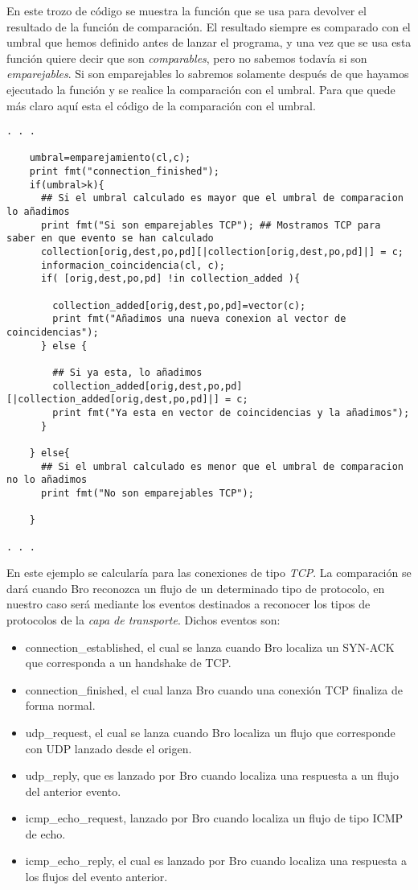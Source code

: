 \noindent En este trozo de código se muestra la función que se usa para devolver 
el resultado de la función de comparación. El resultado siempre es comparado 
con el umbral que hemos definido antes de lanzar el programa, y una vez que se 
usa esta función quiere decir que son \textit{comparables}, pero no sabemos todavía si son 
\textit{emparejables}. Si son emparejables lo sabremos solamente después de 
que hayamos ejecutado la función y se realice la comparación con el umbral. Para que 
quede más claro aquí esta el código de la comparación con el umbral.

\begin{lstlisting}[style=CodidoC]
. . .

	umbral=emparejamiento(cl,c);
    print fmt("connection_finished");
    if(umbral>k){
      ## Si el umbral calculado es mayor que el umbral de comparacion lo añadimos
      print fmt("Si son emparejables TCP"); ## Mostramos TCP para saber en que evento se han calculado
      collection[orig,dest,po,pd][|collection[orig,dest,po,pd]|] = c;
      informacion_coincidencia(cl, c);
      if( [orig,dest,po,pd] !in collection_added ){

        collection_added[orig,dest,po,pd]=vector(c);
        print fmt("Añadimos una nueva conexion al vector de coincidencias");
      } else {

        ## Si ya esta, lo añadimos
        collection_added[orig,dest,po,pd][|collection_added[orig,dest,po,pd]|] = c;
        print fmt("Ya esta en vector de coincidencias y la añadimos");
      }

    } else{
      ## Si el umbral calculado es menor que el umbral de comparacion no lo añadimos
      print fmt("No son emparejables TCP");

    }
    
. . .
\end{lstlisting}

\noindent En este ejemplo se calcularía para las conexiones de tipo \textit{TCP}.
\intro
La comparación se dará cuando Bro reconozca un flujo de un determinado tipo 
de protocolo, en nuestro caso será mediante los eventos destinados a 
reconocer los tipos de protocolos de la \textit{capa de transporte}.
Dichos eventos son:

\begin{itemize}
\item connection\_established, el cual se lanza cuando Bro localiza un SYN-ACK que corresponda a un handshake de TCP.
\item connection\_finished, el cual lanza Bro cuando una conexión TCP finaliza de forma normal. 
\item udp\_request, el cual se lanza cuando Bro localiza un flujo que corresponde con UDP lanzado desde el origen.
\item udp\_reply, que es lanzado por Bro cuando localiza una respuesta a un flujo del anterior evento.
\item icmp\_echo\_request, lanzado por Bro cuando localiza un flujo de tipo ICMP de echo.
\item icmp\_echo\_reply, el cual es lanzado por Bro cuando localiza una respuesta a los flujos del evento anterior.
\end{itemize}

